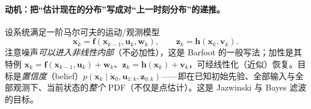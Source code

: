 \paragraph{动机：把“估计现在的分布”写成对“上一时刻分布”的递推。}
设系统满足一阶马尔可夫的运动/观测模型
\begin{equation}
  \mathbf{x}_k=\mathbf{f}(\mathbf{x}_{k-1},\mathbf{u}_k,\mathbf{w}_k),\qquad
  \mathbf{z}_k=\mathbf{h}(\mathbf{x}_k,\mathbf{v}_k).
  \label{eq:bf-model}
\end{equation}
注意噪声\emph{可以进入非线性内部}（不必加性），这是 Barfoot\cite{barfoot2024state} 的一般写法；加性是其特例 $\mathbf{x}_k=\mathbf{f}(\mathbf{x}_{k-1},\mathbf{u}_k)+\mathbf{w}_k$、$\mathbf{z}_k=\mathbf{h}(\mathbf{x}_k)+\mathbf{v}_k$，可经线性化（近似）恢复。目标是\emph{置信度}（belief）$p(\mathbf{x}_k\mid\check{\mathbf{x}}_0,\mathbf{u}_{1:k},\mathbf{z}_{0:k})$——即在已知初始先验、全部输入与全部观测下、当前状态的\emph{整个} PDF（不仅是点估计）。这是 Jazwinski 与 Bayes 滤波的目标。

